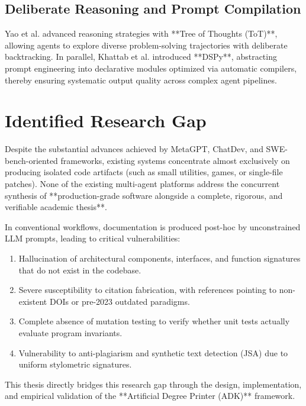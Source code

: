 \subsection{Deliberate Reasoning and Prompt Compilation}
Yao et al. \cite{Yao2023TreeOfThoughts} advanced reasoning strategies with **Tree of Thoughts (ToT)**, allowing agents to explore diverse problem-solving trajectories with deliberate backtracking. In parallel, Khattab et al. \cite{Khattab2024DSPy} introduced **DSPy**, abstracting prompt engineering into declarative modules optimized via automatic compilers, thereby ensuring systematic output quality across complex agent pipelines.

\section{Identified Research Gap}
\label{sec:research_gap}

Despite the substantial advances achieved by MetaGPT, ChatDev, and SWE-bench-oriented frameworks, existing systems concentrate almost exclusively on producing isolated code artifacts (such as small utilities, games, or single-file patches). None of the existing multi-agent platforms address the concurrent synthesis of **production-grade software alongside a complete, rigorous, and verifiable academic thesis**.

In conventional workflows, documentation is produced post-hoc by unconstrained LLM prompts, leading to critical vulnerabilities:
\begin{enumerate}
    \item Hallucination of architectural components, interfaces, and function signatures that do not exist in the codebase.
    \item Severe susceptibility to citation fabrication, with references pointing to non-existent DOIs or pre-2023 outdated paradigms.
    \item Complete absence of mutation testing to verify whether unit tests actually evaluate program invariants.
    \item Vulnerability to anti-plagiarism and synthetic text detection (JSA) due to uniform stylometric signatures.
\end{enumerate}

This thesis directly bridges this research gap through the design, implementation, and empirical validation of the **Artificial Degree Printer (ADK)** framework.

